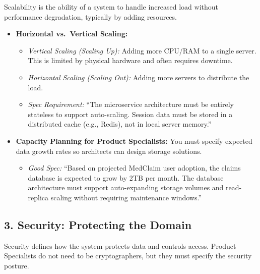 Scalability is the ability of a system to handle increased load without
performance degradation, typically by adding resources.

\begin{itemize}
\tightlist
\item
  \textbf{Horizontal vs.~Vertical Scaling:}

  \begin{itemize}
  \tightlist
  \item
    \emph{Vertical Scaling (Scaling Up):} Adding more CPU/RAM to a
    single server. This is limited by physical hardware and often
    requires downtime.
  \item
    \emph{Horizontal Scaling (Scaling Out):} Adding more servers to
    distribute the load.
  \item
    \emph{Spec Requirement:} ``The microservice architecture must be
    entirely stateless to support auto-scaling. Session data must be
    stored in a distributed cache (e.g., Redis), not in local server
    memory.''
  \end{itemize}
\item
  \textbf{Capacity Planning for Product Specialists:} You must specify
  expected data growth rates so architects can design storage solutions.

  \begin{itemize}
  \tightlist
  \item
    \emph{Good Spec:} ``Based on projected MedClaim user adoption, the
    claims database is expected to grow by 2TB per month. The database
    architecture must support auto-expanding storage volumes and
    read-replica scaling without requiring maintenance windows.''
  \end{itemize}
\end{itemize}

\subsection{3. Security: Protecting the
Domain}\label{security-protecting-the-domain}

Security defines how the system protects data and controls access.
Product Specialists do not need to be cryptographers, but they must
specify the security posture.

